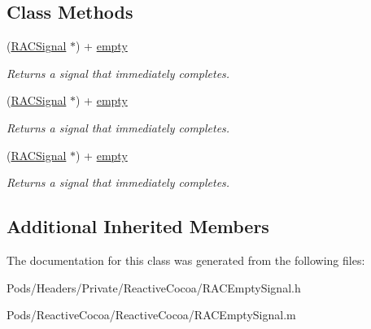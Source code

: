 \subsection*{Class Methods}
\begin{DoxyCompactItemize}
\item 
\mbox{\label{interface_r_a_c_empty_signal_a44bac13fa94e1789f84fc8fb9e7d40b9}} 
(\mbox{\hyperlink{interface_r_a_c_signal}{R\+A\+C\+Signal}} $\ast$) + \mbox{\hyperlink{interface_r_a_c_empty_signal_a44bac13fa94e1789f84fc8fb9e7d40b9}{empty}}
\begin{DoxyCompactList}\small\item\em Returns a signal that immediately completes. \end{DoxyCompactList}\item 
\mbox{\label{interface_r_a_c_empty_signal_a44bac13fa94e1789f84fc8fb9e7d40b9}} 
(\mbox{\hyperlink{interface_r_a_c_signal}{R\+A\+C\+Signal}} $\ast$) + \mbox{\hyperlink{interface_r_a_c_empty_signal_a44bac13fa94e1789f84fc8fb9e7d40b9}{empty}}
\begin{DoxyCompactList}\small\item\em Returns a signal that immediately completes. \end{DoxyCompactList}\item 
\mbox{\label{interface_r_a_c_empty_signal_a44bac13fa94e1789f84fc8fb9e7d40b9}} 
(\mbox{\hyperlink{interface_r_a_c_signal}{R\+A\+C\+Signal}} $\ast$) + \mbox{\hyperlink{interface_r_a_c_empty_signal_a44bac13fa94e1789f84fc8fb9e7d40b9}{empty}}
\begin{DoxyCompactList}\small\item\em Returns a signal that immediately completes. \end{DoxyCompactList}\end{DoxyCompactItemize}
\subsection*{Additional Inherited Members}


The documentation for this class was generated from the following files\+:\begin{DoxyCompactItemize}
\item 
Pods/\+Headers/\+Private/\+Reactive\+Cocoa/R\+A\+C\+Empty\+Signal.\+h\item 
Pods/\+Reactive\+Cocoa/\+Reactive\+Cocoa/R\+A\+C\+Empty\+Signal.\+m\end{DoxyCompactItemize}
